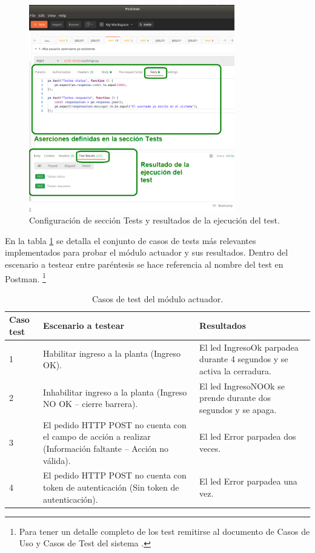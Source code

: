 \begin{figure}[ht]
	\centering
	\includegraphics[width=0.8\textwidth]{./Figures/PostmanAsercion.png}
	\caption{Configuración de sección Tests y resultados de la ejecución del test.}
	\label{fig:PostmanAsercion}
\end{figure}

En la tabla  \ref{tab:tablaTestNodActuador} se detalla el conjunto de casos de tests más relevantes implementados para probar el módulo actuador y sus resultados. Dentro del escenario a testear entre paréntesis se hace referencia al nombre del test en Postman. \footnote{Para tener un detalle completo de los test remitirse al documento de Casos de Uso y Casos de Test del sistema \citep{WEBSITE:CasosUsoYTest}.}


\begin{table}[h]
	\centering
	\caption[Tipos de pruebas actuador]{Casos de test del módulo actuador.}
	\begin{tabular}{p{1.5cm} p{6.5cm} p{4.5cm}} 	

		\toprule
		\textbf{Caso test} & 
		\textbf{Escenario a testear} & 
		\textbf{Resultados} 
		\\
		\midrule
1 & Habilitar ingreso a la planta (Ingreso OK). & El led IngresoOk parpadea durante 4 segundos y se activa la cerradura. \\
2 & Inhabilitar ingreso a la planta (Ingreso NO OK – cierre barrera).	& El led IngresoNOOk se prende durante dos segundos y se apaga. \\
3 & El pedido HTTP POST no cuenta con el campo de acción a realizar (Información faltante – Acción no válida). & El led Error parpadea dos veces. \\
4 & El pedido HTTP POST no cuenta con token de autenticación (Sin token de autenticación). & El led Error parpadea una vez. \\	   
		\bottomrule
		\hline
	\end{tabular}
	\label{tab:tablaTestNodActuador}
\end{table}




